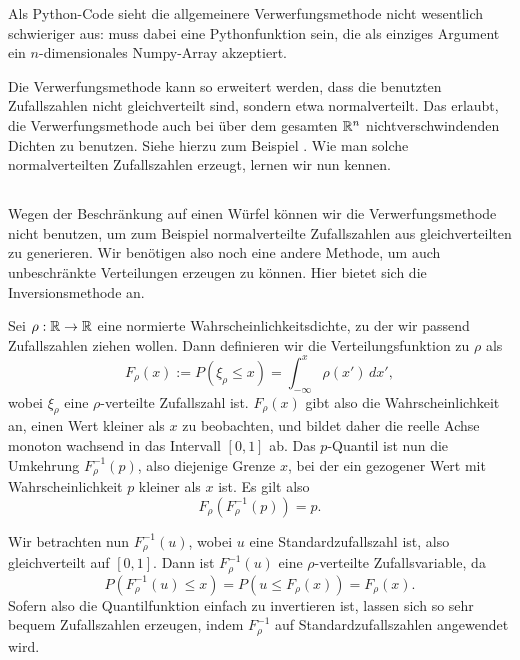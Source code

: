 Als Python-Code sieht die allgemeinere Verwerfungsmethode nicht
wesentlich schwieriger aus:
%
 muss dabei eine Pythonfunktion sein, die als einziges
Argument ein $n$-dimensionales Numpy-Array akzeptiert.

Die Verwerfungsmethode kann so erweitert werden, dass die benutzten
Zufallszahlen  nicht gleichverteilt sind, sondern etwa
normalverteilt. Das erlaubt, die Verwerfungsmethode auch bei über dem
gesamten $\mathbb{R}^n$ nichtverschwindenden Dichten zu benutzen. Siehe
hierzu zum Beispiel \textcite{knuth81b}. Wie man solche
normalverteilten Zufallszahlen erzeugt, lernen wir nun kennen.

\subsection{}

Wegen der Beschränkung auf einen Würfel können wir die
Verwerfungsmethode nicht benutzen, um zum Beispiel normalverteilte
Zufallszahlen aus gleichverteilten zu generieren. Wir benötigen also
noch eine andere Methode, um auch unbeschränkte Verteilungen erzeugen
zu können. Hier bietet sich die Inversionsmethode an.

Sei $\rho:\mathbb{R}\to \mathbb{R}$ eine normierte Wahrscheinlichkeitsdichte, zu der
wir passend Zufallszahlen ziehen wollen. Dann definieren wir die
Verteilungsfunktion zu $\rho$ als
\begin{equation}
  F_\rho(x) := P(\xi_\rho \le x) = \int_{-\infty}^{x} \rho(x')\, dx',
\end{equation}
wobei $\xi_\rho$ eine $\rho$-verteilte Zufallszahl ist.  $F_\rho(x)$
gibt also die Wahrscheinlichkeit an, einen Wert kleiner als $x$ zu
beobachten, und bildet daher die reelle Achse monoton wachsend in das
Intervall $[0,1]$ ab. Das $p$-Quantil ist nun die Umkehrung
$F_\rho^{-1}(p)$, also diejenige Grenze $x$, bei der ein gezogener
Wert mit Wahrscheinlichkeit $p$ kleiner als $x$ ist. Es gilt also
\begin{equation}
  F_\rho\left(F_\rho^{-1}(p)\right) = p.
\end{equation}

Wir betrachten nun $F_\rho^{-1}(u)$, wobei $u$ eine
Standardzufallszahl ist, also gleichverteilt auf $[0,1]$.  Dann ist
$F_\rho^{-1}(u)$ eine $\rho$-verteilte Zufallsvariable, da
\begin{equation}
  P(F_\rho^{-1}(u) \le x) = P(u \le F_\rho(x)) = F_\rho(x).
\end{equation}
Sofern also die Quantilfunktion einfach zu invertieren ist, lassen
sich so sehr bequem Zufallszahlen erzeugen, indem $F_\rho^{-1}$ auf
Standardzufallszahlen angewendet wird.

